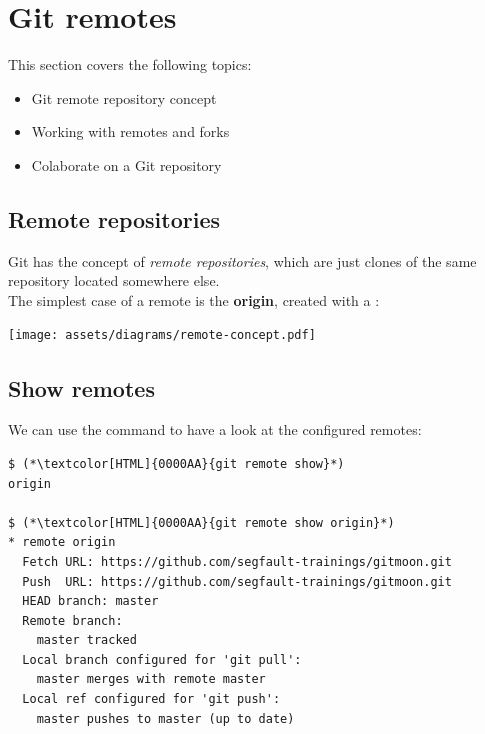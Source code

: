 \section{Git remotes}
\begin{frame}[fragile]
  \slidetitle
  This section covers the following topics:
  \begin{itemize}
    \item Git remote repository concept
    \item Working with remotes and forks
    \item Colaborate on a Git repository
  \end{itemize}
\end{frame}

\subsection{Remote repositories}
\begin{frame}[fragile]
  \subslidetitle
  Git has the concept of \textit{remote repositories},
  which are just clones of the same repository located
  somewhere else. \\

  The simplest case of a remote is the \textbf{origin},
  created with a :

  \vspace{3em}
  \centerline{\texttt{[image: assets/diagrams/remote-concept.pdf]}}
\end{frame}

\subsection{Show remotes}
\begin{frame}[fragile]
  \subslidetitle
  We can use the  command to have a look at the configured remotes:
  \begin{lstlisting}
$ (*\textcolor[HTML]{0000AA}{git remote show}*)
origin

$ (*\textcolor[HTML]{0000AA}{git remote show origin}*)
* remote origin
  Fetch URL: https://github.com/segfault-trainings/gitmoon.git
  Push  URL: https://github.com/segfault-trainings/gitmoon.git
  HEAD branch: master
  Remote branch:
    master tracked
  Local branch configured for 'git pull':
    master merges with remote master
  Local ref configured for 'git push':
    master pushes to master (up to date)
\end{lstlisting}
\end{frame}

